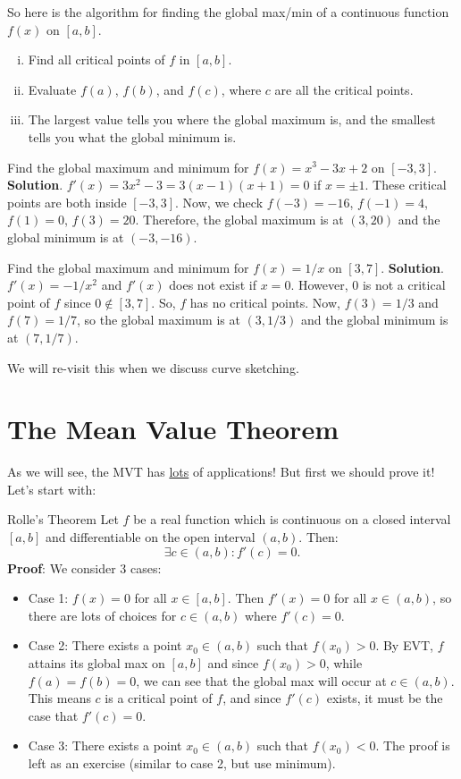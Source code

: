 So here is the algorithm for finding the global max/min
of a continuous function $ f(x) $ on $ [a,b] $.
\begin{enumerate}[(i)]
    \item Find all critical points of $ f $ in $ [a,b] $.
    \item Evaluate $ f(a) $, $ f(b) $, and $ f(c) $, where $ c $ are all the critical points.
    \item The largest value tells you where the global maximum is, and the smallest tells you what the global minimum is.
\end{enumerate}
\begin{Example}{}{}
    Find the global maximum and minimum for $ f(x)=x^3-3x+2 $ on $ [-3,3] $.
    \tcblower{}
    \textbf{Solution}. $ f'(x)=3x^2-3=3(x-1)(x+1)=0 $ if $ x=\pm 1 $.
    These critical points are both inside $ [-3,3] $. Now, we check
    $ f(-3)=-16 $, $ f(-1)=4 $, $ f(1)=0 $, $ f(3)=20 $. Therefore, the global maximum is at $ (3,20) $ and
    the global minimum is at $ (-3,-16) $.
\end{Example}
\begin{Example}{}{}
    Find the global maximum and minimum for $ f(x)=1/x $ on $ [3,7] $.
    \tcblower{}
    \textbf{Solution}. $ f'(x)=-1/x^2 $ and $ f'(x) $ does not exist if $ x=0 $.
    However, $ 0 $ is not a critical point of $ f $ since $ 0\notin [3,7] $.
    So, $ f $ has no critical points. Now, $ f(3)=1/3 $ and $ f(7)=1/7 $, so
    the global maximum is at $ (3,1/3) $ and the global minimum is at $ (7,1/7) $.
\end{Example}
We will re-visit this when we discuss curve sketching.

\chapter{The Mean Value Theorem}
As we will see, the MVT has \underline{lots} of applications! But first we should prove it! Let's start with:
\begin{Theorem}{Rolle's Theorem}{}
    Let $ f $ be a real function which is continuous on a closed interval
    $ [a,b] $ and differentiable on the open interval $ (a,b) $.\smallskip
    Then:
    \[ \exists c\in(a,b):f'(c)=0. \]
    \tcblower{}
    \textbf{Proof}: We consider 3 cases:
    \begin{itemize}
        \item Case 1: $ f(x)=0 $ for all $ x\in[a,b] $. Then $ f'(x)=0 $ for all $ x\in(a,b) $,
              so there are lots of choices for $ c\in(a,b) $ where $ f'(c)=0 $.
        \item Case 2: There exists a point $ x_0\in(a,b) $ such that $ f(x_0)>0 $. By EVT, $ f $
              attains its global max on $ [a,b] $ and since $ f(x_0)>0 $, while $ f(a)=f(b)=0 $,
              we can see that the global max will occur at $ c\in(a,b) $. This means $ c $
              is a critical point of $ f $, and since $ f'(c) $ exists, it must be the case that $ f'(c)=0 $.
        \item Case 3: There exists a point $ x_0\in(a,b) $ such that $ f(x_0)<0 $. The proof is left
              as an exercise (similar to case 2, but use minimum).
    \end{itemize}
\end{Theorem}
